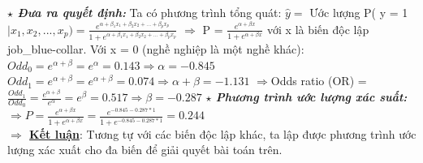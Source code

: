 \documentclass{report}
\newcommand\tab[1][1.25cm]{\hspace*{#1}}
\begin{document}
        \fontsize{13}{10}\selectfont \textbf{$\star$\textit{ Đưa ra quyết định:}}
            \vspace{0.2cm}\newline Ta có phương trình tổng quát:
            \vspace{0.2cm}\newline\tab[1cm] $\hat{y} = $ Ước lượng P( y = 1 $\mid x_1, x_2,...,x_p) = \frac{e^{\alpha + \beta_1x_1 + \beta_2x_2 + ... + \beta_px_p}}{1 + e^{\alpha + \beta_1x_1 + \beta_2x_2 + ... + \beta_px_p}}$
            \vspace{0.2cm}\newline\tab[1cm] $\Rightarrow $ P = $\frac{e^{\alpha + \beta x}}{1 + e^{\alpha + \beta x}}$ với x là biến độc lập job\_blue-collar. Với x = 0 (nghề nghiệp là một nghề khác):
            \vspace{0.2cm}\newline\tab[2.5cm] $Odd_0 = e^{\alpha + \beta} = e^{\alpha} = 0.143 \Rightarrow \alpha = -0.845$
            \vspace{0.2cm}\newline\tab[2.5cm] $Odd_1 = e^{\alpha + \beta} = e^{\alpha + \beta} = 0.074 \Rightarrow \alpha + \beta = -1.131$
            \vspace{0.2cm}\newline\tab[2.5cm] $\Rightarrow $Odds ratio (OR) = $\frac{Odd_1}{Odd_0} = \frac{e^{\alpha + \beta}}{e^{\alpha}} = e^{\beta} = 0.517 \Rightarrow \beta = -0.287$
        \fontsize{13}{10}\selectfont \vspace{0.2cm}\newline\textbf{$\star$\textit{ Phương trình ước lượng xác suất:}}
            \vspace{0.2cm}\newline\tab[2.5cm] $\Rightarrow P = \frac{e^{\alpha + \beta x}}{1 + e^{\alpha + \beta x}} = \frac{e^{-0.845 - 0.287 * 1}}{1 + e^{-0.845 - 0.287 * 1}} = 0.244$\\
        \fontsize{13}{10}\selectfont\textbf{$\Longrightarrow$ \underline{{Kết luận}}}: Tương tự với các biến độc lập khác, ta lập được phương trình ước lượng xác xuất cho đa biến để giải quyết bài toán trên.
    
    \pagebreak
    
    \fontsize{16}{10}\selectfont
\end{document}
